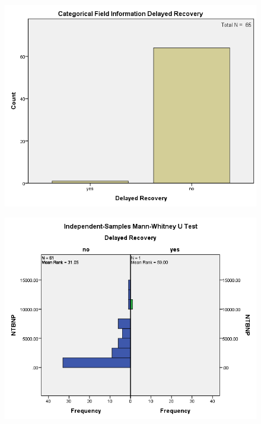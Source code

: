 \documentclass[14pt,a4paper,onecolumn]{extarticle}
\begin{document}
\clearpage
\begin{figure}
    \centering
    \includegraphics[scale=0.7]{./images/cat_recovery.png}
    \caption{}
    \label{}
\end{figure}

\clearpage
\begin{figure}
    \centering
    \includegraphics[scale=0.7]{./images/manwhit_recovery.png}
    \caption{}
    \label{}
\end{figure}
\end{document}

